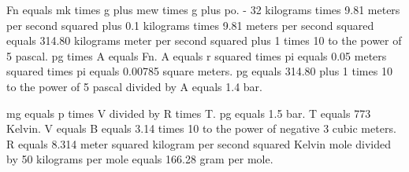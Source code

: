 Fn equals mk times g plus mew times g plus po.  
- 32 kilograms times 9.81 meters per second squared plus 0.1 kilograms times 9.81 meters per second squared equals 314.80 kilograms meter per second squared plus 1 times 10 to the power of 5 pascal.  
pg times A equals Fn.  
A equals r squared times pi equals 0.05 meters squared times pi equals 0.00785 square meters.  
pg equals 314.80 plus 1 times 10 to the power of 5 pascal divided by A equals 1.4 bar.  

mg equals p times V divided by R times T.  
pg equals 1.5 bar.  
T equals 773 Kelvin.  
V equals B equals 3.14 times 10 to the power of negative 3 cubic meters.  
R equals 8.314 meter squared kilogram per second squared Kelvin mole divided by 50 kilograms per mole equals 166.28 gram per mole.
